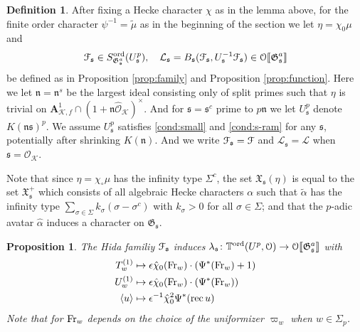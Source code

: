 \documentclass[leqno]{amsart}
\newtheorem{prop}[thm]{Proposition}
\theoremstyle{definition}
\newtheorem{defn}[thm]{Definition}
\theoremstyle{remark}
\newcommand{\oo}{\mathcal{O}}
\newcommand{\eo}{\EuScript{O}}
\newcommand{\A}{\mathbf A}
\DeclareMathOperator{\rec}{rec}
\newcommand{\Fr}{\textnormal{Fr}} %
\newcommand{\fn}{\mathfrak{n}}
\newcommand{\fs}{\mathfrak{s}}
\newcommand{\K}{{\mathcal{K}}} %
\newcommand{\fG}{\mathfrak{G}}
\newcommand{\fX}{\mathfrak{X}}
\newcommand{\TT}{\mathbb{T}} %
\newcommand{\euF}{\EuScript{F}} %
\newcommand{\ord}{\textnormal{ord}} %
\begin{document}
\begin{defn}

After fixing a Hecke character $\chi$
as in the lemma above,
for the finite order character 
$\psi^{-1}=\tilde{\mu}$
as in the beginning of the section
we let $\eta=\chi_0\mu$ and 
\[
    \euF_{\fs}\in S^{\ord}_{\fG_\fs^a}(U^p_{\fs}),\quad
    \mathcal{L}_\fs=B_\fs(\euF_{\fs}, U_\fs^{-1}\euF_{\fs})
    \in \eo\llbracket\fG_{\fs}^a\rrbracket
\]
be defined as in 
Proposition \ref{prop:family} and
Proposition \ref{prop:function}.
Here we let $\fn=\fn^s$ be the largest ideal
consisting only of split primes such that
$\eta$ is trivial on 
$\A_{\K,f}^1\cap (1+\fn\widehat{\oo}_\K)^\times$.
And for $\fs=\fs^c$ prime to $p\fn$
we let $U^p_\fs$ denote $K(\fn\fs)^p$.
We assume $U^p_{\fs}$
satisfies \eqref{cond:small} and \eqref{cond:s-ram}
for any $\fs$,
potentially after shrinking $K(\fn)$.
And we write $\euF_\fs=\euF$
and $\mathcal{L}_\fs=\mathcal{L}$
when $\fs=\oo_\K$.

Note that since $\eta=\chi_\circ\mu$
has the infinity type $\Sigma^c$,
the set $\fX_\fs(\eta)$ is equal to the set $\fX_\fs^+$ which
consists of all algebraic Hecke characters $\alpha$
such that $\tilde{\alpha}$
has the infinity type 
$\sum_{\sigma\in\Sigma}k_\sigma(\sigma-\sigma^c)$
with $k_\sigma>0$ for all $\sigma\in\Sigma$;
and that the $p$-adic avatar $\hat{\alpha}$
induces a character on $\fG_{\fs}$.

\end{defn}

\begin{prop}
The Hida familiy $\euF_\fs$
induces $\lambda_{\fs}\colon \TT^{\ord}(U^p,\eo)
\to \eo\llbracket\fG_\fs^a\rrbracket$ with
\begin{align*}
T_w^{(1)}&\mapsto\epsilon\hat{\chi}_0(\Fr_w)\cdot(\Psi^*(\Fr_w)+1)\\
U_w^{(1)}&\mapsto\epsilon\hat{\chi}_0(\Fr_w)\cdot(\Psi^*(\Fr_w))\\
\langle u\rangle&\mapsto \epsilon^{-1}\hat{\chi}^2_0\Psi^*(\rec u)
\end{align*}
Note that for $\Fr_w$ depends on the 
choice of the uniformizer  $\varpi_w$ when  $w\in \Sigma_p$.
\end{prop}
\end{document}
